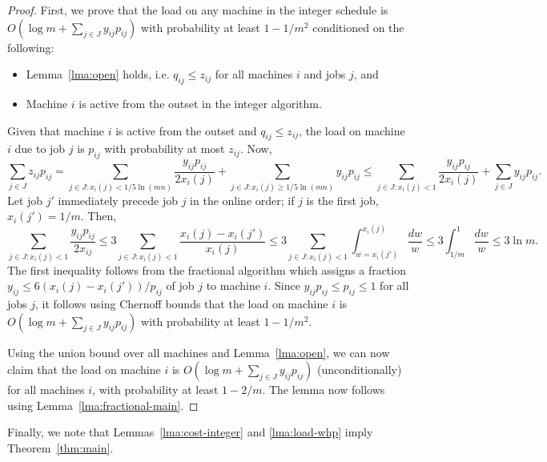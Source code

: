 \documentclass[11pt]{article}
\begin{document}
\begin{proof}
First, we prove that the load on any machine in the integer schedule is 
$O(\log m + \sum_{j\in J} y_{ij} p_{ij})$ with probability at least $1 - 1/m^2$
conditioned on the following:
\begin{itemize} 
\item Lemma~\ref{lma:open} holds, i.e. $q_{ij}\leq z_{ij}$ for all machines $i$ and
jobs $j$, and
\item Machine $i$ is active from the outset in the integer algorithm.
\end{itemize}
Given that machine $i$ is active from the outset and $q_{ij} \leq z_{ij}$, 
the load on machine $i$ due to job $j$ is $p_{ij}$ with probability at most $z_{ij}$. 
Now,
\begin{equation*}
	\sum_{j\in J} z_{ij} p_{ij} 
	= \sum_{j\in J: x_i(j) < 1/5 \ln (mn)} \frac{y_{ij} p_{ij}}{2x_i(j)} + \sum_{j\in J: x_i(j) \geq 1/5 \ln (mn)} y_{ij} p_{ij}
	\leq \sum_{j\in J: x_i(j) < 1} \frac{y_{ij} p_{ij}}{2x_i(j)} + \sum_{j\in J} y_{ij} p_{ij}.
\end{equation*}
Let job $j'$ immediately precede job $j$ in the online order; if $j$ is the first job,
$x_i(j') = 1/m$. Then,
\begin{equation*}
	\sum_{j\in J: x_i(j) < 1} \frac{y_{ij} p_{ij}}{2x_{ij}} 
	\leq 3 \sum_{j\in J: x_i(j) < 1} \frac{x_i(j) - x_i(j')}{x_i(j)}
	\leq 3 \sum_{j\in J: x_i(j) < 1} \int_{w = x_i(j')}^{x_i(j)} \frac{dw}{w}
	\leq 3 \int_{1/m}^1 \frac{dw}{w}
	\leq 3 \ln m.
\end{equation*}
The first inequality follows from the fractional algorithm which assigns a 
fraction $y_{ij} \leq 6(x_i(j) - x_i(j'))/p_{ij}$ of job $j$ to machine $i$.
Since $y_{ij} p_{ij} \leq p_{ij} \leq 1$ for all jobs $j$, it follows using 
Chernoff bounds that the load on machine $i$ is 
$O(\log m + \sum_{j\in J} y_{ij} p_{ij})$ with probability at least $1 - 1/m^2$.

Using the union bound over all machines and Lemma~\ref{lma:open},
we can now claim that the load on machine $i$ is 
$O(\log m + \sum_{j\in J} y_{ij} p_{ij})$ (unconditionally) for all machines $i$,
with probability at least $1-2/m$. 
The lemma now follows using Lemma~\ref{lma:fractional-main}.
\end{proof}
\noindent
Finally, we note that Lemmas~\ref{lma:cost-integer} and \ref{lma:load-whp} imply 
Theorem~\ref{thm:main}.

\newpage



\end{document}
